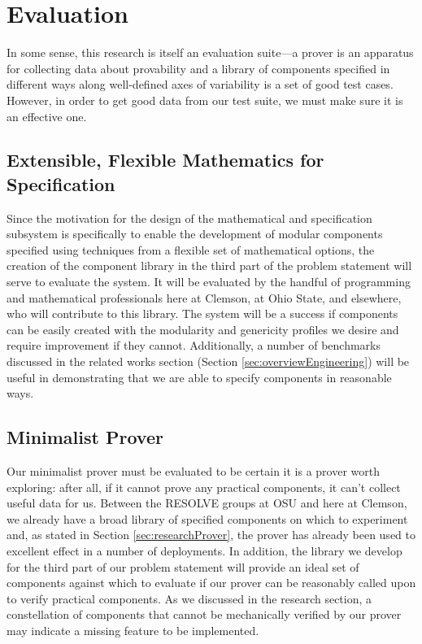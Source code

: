 \section{Evaluation}\label{sec:evaluation}
In some sense, this research is itself an evaluation suite---a prover is an apparatus for collecting data about provability and a library of components specified in different ways along well-defined axes of variability is a set of good test cases.  However, in order to get good data from our test suite, we must make sure it is an effective one.

\subsection{Extensible, Flexible Mathematics for Specification}\label{sec:evalMath}
Since the motivation for the design of the mathematical and specification subsystem is specifically to enable the development of modular components specified using techniques from a flexible set of mathematical options, the creation of the component library in the third part of the problem statement will serve to evaluate the system.  It will be evaluated by the handful of programming and mathematical professionals here at Clemson, at Ohio State, and elsewhere, who will contribute to this library.  The system will be a success if components can be easily created with the modularity and genericity profiles we desire and require improvement if they cannot.  Additionally, a number of benchmarks discussed in the related works section (Section \ref{sec:overviewEngineering}) will be useful in demonstrating that we are able to specify components in reasonable ways.

\subsection{Minimalist Prover}\label{sec:evalProver}
Our minimalist prover must be evaluated to be certain it is a prover worth exploring: after all, if it cannot prove any practical components, it can't collect useful data for us.  Between the RESOLVE groups at OSU and here at Clemson, we already have a broad library of specified components on which to experiment and, as stated in Section \ref{sec:researchProver}, the prover has already been used to excellent effect in a number of deployments.  In addition, the library we develop for the third part of our problem statement will provide an ideal set of components against which to evaluate if our prover can be reasonably called upon to verify practical components.  As we discussed in the research section, a constellation of components that cannot be mechanically verified by our prover may indicate a missing feature to be implemented.

